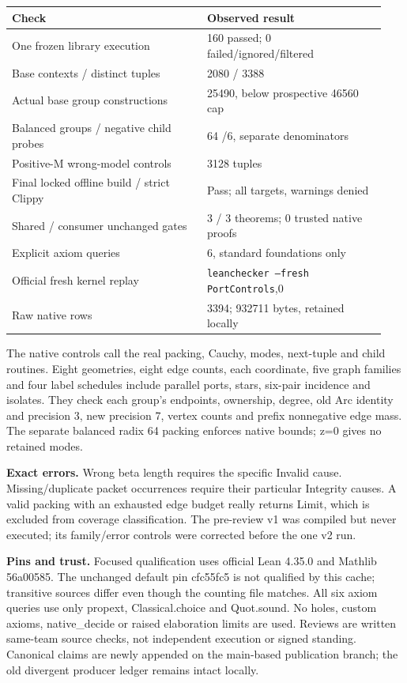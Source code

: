 \documentclass[10pt]{article}
\begin{document}
\begin{tabular}{p{0.49\linewidth}p{0.45\linewidth}}
\toprule
Check & Observed result\\\midrule
One frozen library execution &160 passed; 0 failed/ignored/filtered\\
Base contexts / distinct tuples &2080 / 3388\\
Actual base group constructions &25490, below prospective 46560 cap\\
Balanced groups / negative child probes &64 /6, separate denominators\\
Positive-M wrong-model controls &3128 tuples\\
Final locked offline build / strict Clippy &Pass; all targets, warnings denied\\
Shared / consumer unchanged gates &3 / 3 theorems; 0 trusted native proofs\\
Explicit axiom queries &6, standard foundations only\\
Official fresh kernel replay &\texttt{leanchecker --fresh PortControls},0\\
Raw native rows &3394; 932711 bytes, retained locally\\
\bottomrule
\end{tabular}

The native controls call the real packing, Cauchy, modes, next-tuple and child
routines. Eight geometries, eight edge counts, each coordinate, five graph
families and four label schedules include parallel ports, stars, six-pair
incidence and isolates. They check each group's endpoints, ownership, degree,
old Arc identity and precision 3, new precision 7, vertex counts and prefix
nonnegative edge mass. The separate balanced radix 64 packing enforces native
bounds; z=0 gives no retained modes.

\textbf{Exact errors.} Wrong beta length requires the specific Invalid cause.
Missing/duplicate packet occurrences require their particular Integrity causes.
A valid packing with an exhausted edge budget really returns Limit, which is
excluded from coverage classification. The pre-review v1 was compiled but never
executed; its family/error controls were corrected before the one v2 run.

\textbf{Pins and trust.} Focused qualification uses official Lean 4.35.0 and
Mathlib 56a00585. The unchanged default pin cfc55fc5 is not qualified by this
cache; transitive sources differ even though the counting file matches. All
six axiom queries use only propext, Classical.choice and Quot.sound. No holes,
custom axioms, native\_decide or raised elaboration limits are used. Reviews
are written same-team source checks, not independent execution or signed
standing. Canonical claims are newly appended on the main-based publication
branch; the old divergent producer ledger remains intact locally.
\end{document}
